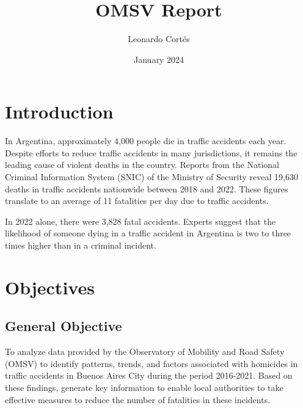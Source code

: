 \documentclass[12pt]{article}
\title{OMSV Report}
\author{Leonardo Cortés}
\date{January 2024}
\begin{document}
\maketitle

\section{Introduction}
In Argentina, approximately 4,000 people die in traffic accidents each year. Despite efforts to reduce traffic accidents in many jurisdictions, it remains the leading cause of violent deaths in the country. Reports from the National Criminal Information System (SNIC) of the Ministry of Security reveal 19,630 deaths in traffic accidents nationwide between 2018 and 2022. These figures translate to an average of 11 fatalities per day due to traffic accidents.

In 2022 alone, there were 3,828 fatal accidents. Experts suggest that the likelihood of someone dying in a traffic accident in Argentina is two to three times higher than in a criminal incident.

\section{Objectives}
\subsection{General Objective}
To analyze data provided by the Observatory of Mobility and Road Safety (OMSV) to identify patterns, trends, and factors associated with homicides in traffic accidents in Buenos Aires City during the period 2016-2021. Based on these findings, generate key information to enable local authorities to take effective measures to reduce the number of fatalities in these incidents.
\end{document}
